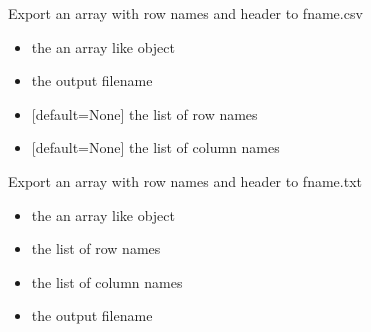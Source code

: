 \documentclass[letterpaper,10pt,english]{sphinxmanual}
\begin{document}
\begin{fulllineitems}
\label{\detokenize{modules_doc:cbmpy.CBTools.exportLabelledArrayWithHeader2CSV}}
\pysigstartsignatures
{}
\pysigstopsignatures
\sphinxAtStartPar
Export an array with row names and header to fname.csv
\begin{itemize}
\item {} 
\sphinxAtStartPar
{} the an array like object

\item {} 
\sphinxAtStartPar
{} the output filename

\item {} 
\sphinxAtStartPar
{} {[}default=None{]} the list of row names

\item {} 
\sphinxAtStartPar
{} {[}default=None{]} the list of column names

\end{itemize}

\end{fulllineitems}


\begin{fulllineitems}
\label{\detokenize{modules_doc:cbmpy.CBTools.exportLabelledArrayWithHeader2TXT}}
\pysigstartsignatures
{}
\pysigstopsignatures
\sphinxAtStartPar
Export an array with row names and header to fname.txt
\begin{itemize}
\item {} 
\sphinxAtStartPar
{} the an array like object

\item {} 
\sphinxAtStartPar
{} the list of row names

\item {} 
\sphinxAtStartPar
{} the list of column names

\item {} 
\sphinxAtStartPar
{} the output filename

\end{itemize}

\end{fulllineitems}
\end{document}
